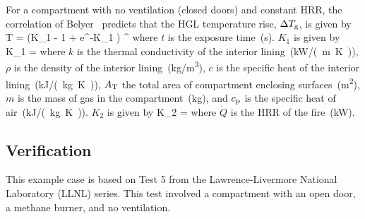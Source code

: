 For a compartment with no ventilation (closed doors) and constant HRR, the correlation of Belyer~\cite{SFPE:Walton} predicts that the HGL temperature rise, $\Delta T\sb{g}$, is given by
\be
\Delta T =  (K_1  - 1 + e^{-K_1 }) \quad ^
\label{eq:Beyler}
\ee
where $t$ is the exposure time~(\si{\second}). $K_1$ is given by
\be
K_1 = 
\label{eq:Beyler_K1}
\ee
where $k$ is the thermal conductivity of the interior lining~(\si{kW/(m.K)}), $\rho$ is the density of the interior lining~(\si{kg/m^3}), $c$ is the specific heat of the interior lining~(\si{kJ/(kg.K)}), $A\sb{T}$ the total area of compartment enclosing surfaces~(\si{m^2}), $m$ is the mass of gas in the compartment~(\si{kg}), and $c\sb{p}$ is the specific heat of air~(\si{kJ/(kg.K)}). $K_2$ is given by
\be
K_2 = 
\label{eq:Beyler_K2}
\ee
where $\dot Q$ is the HRR of the fire~(\si{kW}).


\clearpage


\subsection*{Verification}

This example case is based on Test 5 from the Lawrence-Livermore National Laboratory (LLNL) series. This test involved a compartment with an open door, a methane burner, and no ventilation.

